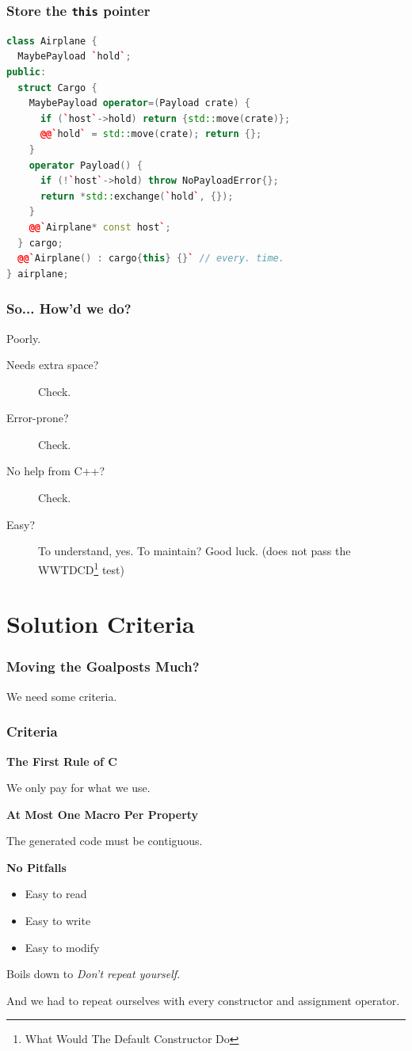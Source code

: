 \documentclass{beamer}
\def\code#1{\texttt{#1}}
\newcommand{\CC}{C\nolinebreak\hspace{-.05em}\raisebox{0.4ex}{\resizebox{!}{0.6\baselineskip}{\bf++}}}
\newcommand{\cplusplus}{\protect\CC\xspace}
\newcommand{\this}{\code{this}\xspace}
\newcommand{\nl}{\vspace{0.2\baselineskip}}
\begin{document}
\begin{frame}[fragile]
\frametitle{Store the \this pointer}
\begin{lstlisting}[language=cpp]
class Airplane {
  MaybePayload `hold`;
public:
  struct Cargo {
    MaybePayload operator=(Payload crate) {
      if (`host`->hold) return {std::move(crate)};
      @@`hold` = std::move(crate); return {};
    }
    operator Payload() {
      if (!`host`->hold) throw NoPayloadError{};
      return *std::exchange(`hold`, {});
    }
    @@`Airplane* const host`;
  } cargo;
  @@`Airplane() : cargo{this} {}` // every. time.
} airplane;
\end{lstlisting}
\end{frame}


\begin{frame}[fragile]
  \frametitle{So... How'd we do?}
\begin{center}
{\Huge Poorly.}
\end{center}
\begin{description}
  \item[Needs extra space?] Check.
  \item[Error-prone?] Check.
  \item[No help from C++?] Check.
  \item[Easy?] To understand, yes. To maintain? Good luck.
    (does not pass the WWTDCD\footnote{What Would The Default Constructor Do}
    test)
\end{description}
\end{frame}


\section{Solution Criteria}
\begin{frame}
  \frametitle{Moving the Goalposts Much?}
\begin{center}
{\Huge We need some criteria.}
\end{center}
\end{frame}


\begin{frame}[fragile]
  \frametitle{Criteria}
  \textbf{The First Rule of \cplusplus}\pause

  We only pay for what we use.\pause\nl\nl\nl


  \textbf{At Most One Macro Per Property}

  The generated code must be contiguous.\pause\nl\nl\nl

  \textbf{No Pitfalls}
  \begin{itemize}
    \item Easy to read
    \item Easy to write
    \item Easy to modify
  \end{itemize}

  \pause
  \begin{center}
    Boils down to \emph{Don't repeat yourself.}
    
    And we had to repeat ourselves with every constructor and assignment
    operator.
  \end{center}
\end{frame}
\end{document}
